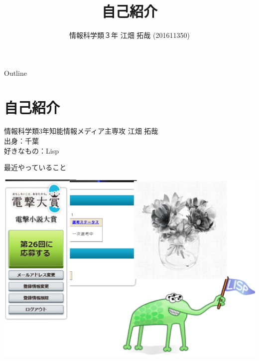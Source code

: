 \documentclass[dvipdfmx,10pt,presentation]{beamer}
\author{情報科学類３年 江畑 拓哉 (201611350)}
\date{}
\title{自己紹介}
\begin{document}
\maketitle
\begin{frame}{Outline}
\tableofcontents
\end{frame}

\section{自己紹介}
\label{sec:orgc8e55ce}
\begin{frame}[label={sec:orgbbcb236}]{}
情報科学類3年知能情報メディア主専攻 江畑 拓哉\\
出身：千葉\\
好きなもの：Lisp\\
\begin{block}{最近やっていること}
\begin{center}
\includegraphics[width=0.7\linewidth]{./res.png}
\end{center}
\end{block}
\end{frame}
\end{document}
